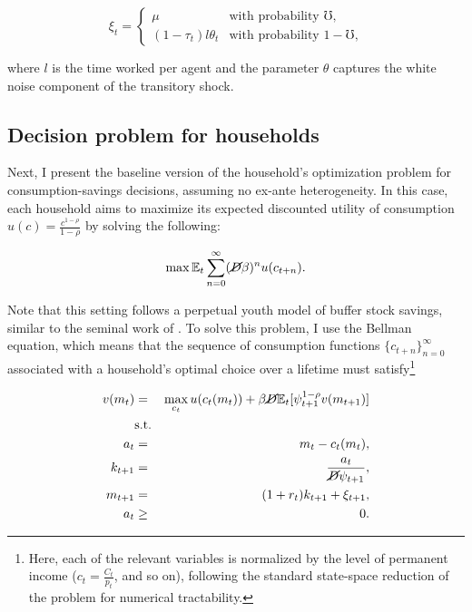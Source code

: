 \begin{equation*}
\xi_t =
    \begin{cases}
        \mu & \text{with probability $\mho$,} \\
        (1-\tau_t) l \theta_t & \text{with probability $1-\mho$,}
    \end{cases}
\end{equation*}

where $l$ is the time worked per agent and the parameter $\theta$ captures the white noise component of the transitory shock.


\subsection{Decision problem for households}

\par Next, I present the baseline version of the household's optimization problem for consumption-savings decisions, assuming no ex-ante heterogeneity. In this case, each household aims to maximize its expected discounted utility of consumption $u(c) = \frac{c^{1-\rho}}{1-\rho}$ by solving the following:

$$ \max \mathbb{E}_t \sum_{n=0}^{\infty}(\cancel{D}\beta)^{n} u(c_{t+n}). $$

\par Note that this setting follows a perpetual youth model of buffer stock savings, similar to the seminal work of \cite{ks1998}. To solve this problem, I use the Bellman equation, which means that the sequence of consumption functions $\{c_{t+n}\}^{\infty}_{n=0}$ associated with a household's optimal choice over a lifetime must satisfy\footnote{Here, each of the relevant variables is normalized by the level of permanent income ($c_t = \frac{C_t}{p_t}$, and so on), following the standard state-space reduction of the problem for numerical tractability.} 

\begin{eqnarray*}
  v(m_t) &=& \max_{c_t} u(c_t(m_t)) + \beta \cancel{D} \mathbb{E}_{t}[\psi_{t+1}^{1-\rho}v(m_{t+1})] \\
  &\text{s.t.}& \\
  a_t &=& m_t - c_t(m_t), \\
  k_{t+1} &=& \frac{a_t}{\cancel{D}\psi_{t+1}}, \\
  m_{t+1} &=& (1 + r_t)k_{t+1} + \xi_{t+1}, \\
  a_t &\geq& 0.
\end{eqnarray*}



